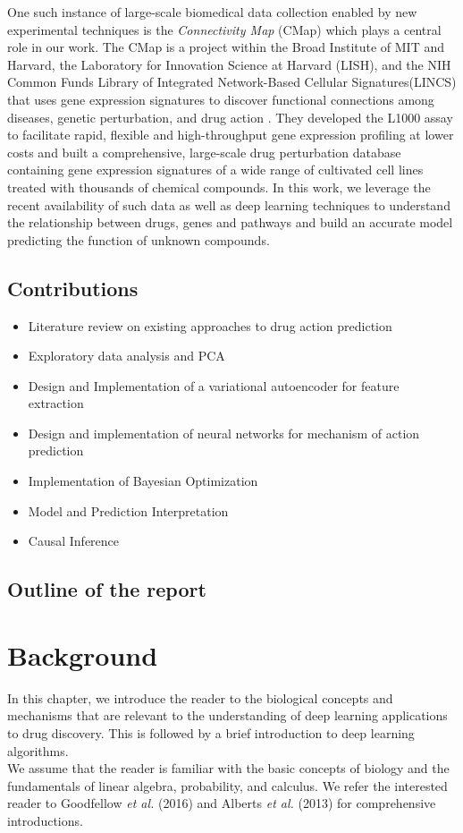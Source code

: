 \documentclass[bsc,frontabs,twoside,singlespacing,parskip,deptreport]{infthesis}     %
\let\Oldsection\section
\renewcommand{\section}{\FloatBarrier\Oldsection}
\begin{document}
One such instance of large-scale biomedical data collection enabled by new experimental techniques is the \textit{Connectivity Map} (CMap) \cite{lamb_connectivity_2006} which plays a central role in our work. The CMap is a project within the Broad Institute of MIT and Harvard, the Laboratory for Innovation Science at Harvard (LISH), and the  NIH  Common  Funds  Library  of  Integrated  Network-Based  Cellular  Signatures(LINCS) that uses gene expression signatures to discover functional connections among diseases, genetic perturbation, and drug action \cite{musa_review_2017}. They developed the L1000 assay to facilitate rapid, flexible and high-throughput gene expression profiling at lower costs \cite{subramanian_next_2017} and built a comprehensive, large-scale drug perturbation database containing gene expression signatures of a wide range of cultivated cell lines treated with thousands of chemical compounds. In this work, we leverage the recent availability of such data as well as deep learning techniques to understand the relationship between drugs, genes and pathways and build an accurate model predicting the function of unknown compounds.


\section{Contributions}
\begin{itemize}
\item Literature review on existing approaches to drug action prediction 
\item Exploratory data analysis and PCA
\item Design and Implementation of a variational autoencoder for feature extraction
\item Design and implementation of neural networks for mechanism of action prediction
\item Implementation of Bayesian Optimization
\item Model and Prediction Interpretation
\item Causal Inference
\end{itemize}
\section{Outline of the report}

\chapter{Background}
In this chapter, we introduce the reader to the biological concepts and mechanisms that are relevant to the understanding of deep learning applications to drug discovery. This is followed by a brief introduction to deep learning algorithms. \\
We assume that the reader is familiar with the basic concepts of biology and the fundamentals of linear algebra, probability, and calculus. We refer the interested reader to Goodfellow \textit{et al.} (2016) \cite{goodfellow_deep_2016} and Alberts \textit{et al.} (2013) \cite{alberts_essential_2013} for comprehensive introductions.
\end{document}

